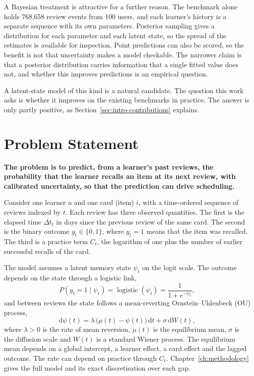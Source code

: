 A Bayesian treatment is attractive for a further reason. The benchmark alone holds 768,658 review
events from 100 users, and each learner's history is a separate sequence with its own parameters.
Posterior sampling gives a distribution for each parameter and each latent state, so the spread of
the estimates is available for inspection. Point predictions can also be scored, so the benefit is
not that uncertainty makes a model checkable. The narrower claim is that a posterior distribution
carries information that a single fitted value does not, and whether this improves predictions is an
empirical question.

A latent-state model of this kind is a natural candidate. The question this work asks is whether
it improves on the existing benchmarks in practice. The answer is only partly positive, as
Section~\ref{sec:intro-contributions} explains.

\section{Problem Statement}
\label{sec:intro-problem}

\textbf{The problem is to predict, from a learner's past reviews, the probability that the learner recalls an item at its next review, with calibrated uncertainty, so that the prediction can drive scheduling.}

Consider one learner $u$ and one card (item) $i$, with a time-ordered sequence of reviews
indexed by $t$. Each review has three observed quantities. The first is the elapsed time
$\Delta t_t$ in days since the previous review of the same card. The second is the binary outcome
$y_t \in \{0,1\}$, where $y_t = 1$ means that the item was recalled. The third is a practice term
$C_t$, the logarithm of one plus the number of earlier successful recalls of the card.

The model assumes a latent memory state $\psi_t$ on the logit scale. The outcome depends on the
state through a logistic link,
\begin{equation}
  P(y_t = 1 \mid \psi_t) = \operatorname{logistic}(\psi_t) = \frac{1}{1 + e^{-\psi_t}},
  \label{eq:observation}
\end{equation}
and between reviews the state follows a mean-reverting Ornstein--Uhlenbeck (OU) process,
\begin{equation}
  \mathrm{d}\psi(t) = \lambda\,\bigl(\mu(t) - \psi(t)\bigr)\,\mathrm{d}t + \sigma\,\mathrm{d}W(t),
  \label{eq:ou}
\end{equation}
where $\lambda > 0$ is the rate of mean reversion, $\mu(t)$ is the equilibrium mean,
$\sigma$ is the diffusion scale and $W(t)$ is a standard Wiener process. The equilibrium mean
depends on a global intercept, a learner effect, a card effect and the lagged outcome. The
rate can depend on practice through $C_t$. Chapter~\ref{ch:methodology} gives the full model
and its exact discretisation over each gap.

